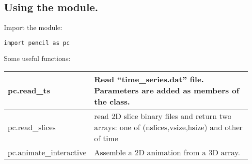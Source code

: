 \documentclass[a4paper,12pt]{article}
\begin{document}
\subsection{Using the module.}
Import the module:
\begin{verbatim}
import pencil as pc
\end{verbatim}
Some useful functions:
\begin{center}
\begin{tabular}{|l|l|}\hline
pc.read\_ts & Read ``time\_series.dat'' file. Parameters are added as members of the class. \\\hline
pc.read\_slices & read 2D slice binary files and return two arrays: one of (nslices,vsize,hsize) and other of time\\\hline
pc.animate\_interactive &  Assemble a 2D animation from a 3D array. \\\hline
\end{tabular}
\end{center}
\end{document}
